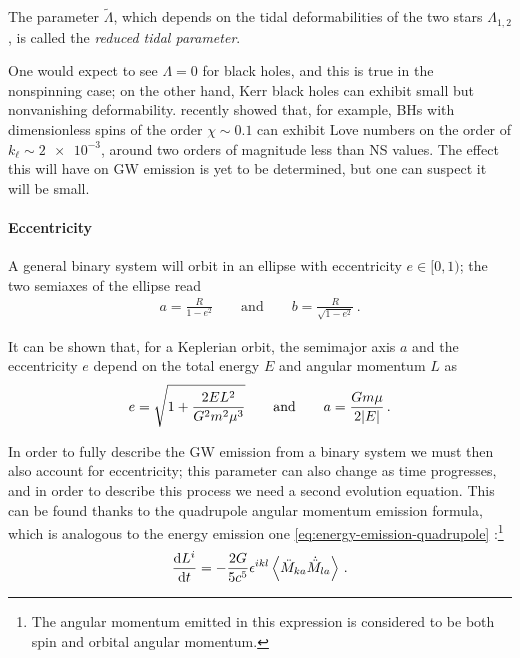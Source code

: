 \documentclass[main.tex]{subfiles}
\begin{document}
The parameter \(\widetilde{\Lambda}\), which depends on the tidal deformabilities of the two stars \(\Lambda_{1, 2}\), is called the \emph{reduced tidal parameter}. 

One would expect to see \(\Lambda = 0\) for black holes, and this is true in the nonspinning case; on the other hand, Kerr black holes can exhibit small but nonvanishing deformability. \textcite{letiecSpinningBlackHoles2021} recently showed that, for example, \acsp{BH} with dimensionless spins of the order \(\chi \sim 0.1\) can exhibit Love numbers on the order of \(k_\ell \sim \num{2e-3}\), around two orders of magnitude less than \ac{NS} values. 
The effect this will have on \ac{GW} emission is yet to be determined, but one can suspect it will be small.

\paragraph{Eccentricity}

A general binary system will orbit in an ellipse with eccentricity \(e \in [0, 1)\); the two semiaxes of the ellipse read \cite[eqs.\ 4.51]{maggioreGravitationalWavesVolume2007}
%
\begin{align}
a = \frac{R}{1- e^2} \qquad \text{and} \qquad
b = \frac{R}{\sqrt{1 - e^2}}
\,.
\end{align}

It can be shown that, for a Keplerian orbit, the semimajor axis \(a\) and the eccentricity \(e\) depend on the total energy \(E\) and angular momentum \(L\) as \cite[eqs.\ 4.50, 4.53]{maggioreGravitationalWavesVolume2007}
%
\begin{align}
e = \sqrt{1 + \frac{2 EL^2}{G^2 m^2 \mu^3}} 
\qquad \text{and} \qquad
a = \frac{Gm \mu }{2 \abs{E}}
\,.
\end{align}

In order to fully describe the \ac{GW} emission from a binary system we must then also account for eccentricity; this parameter can also change as time progresses, and in order to describe this process we need a second evolution equation.
This can be found thanks to the quadrupole angular momentum emission formula, which is analogous to the energy emission one \eqref{eq:energy-emission-quadrupole} \cite[eq.\ 3.99]{maggioreGravitationalWavesVolume2007}:\footnote{The angular momentum emitted in this expression is considered to be both spin and orbital angular momentum.} 
%
\begin{align}
\dv{L^{i}}{t} = - \frac{2G}{5c^{5}} \epsilon^{ikl} \expval{ \ddot{M}_{ka} \dot{\ddot{M}}_{la}} 
\,.
\end{align}
\end{document}
